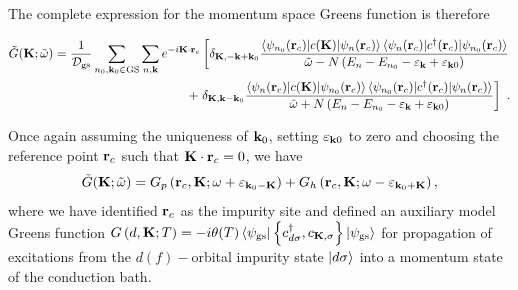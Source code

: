 \documentclass[reprint,hidelinks]{revtex4-2}
\begin{document}
The complete expression for the momentum space Greens function is therefore
\begin{widetext}
\begin{equation}\begin{aligned}
	\tilde G({\bf K}; \tilde\omega) = \frac{1}{\mathcal{D}_\text{gs}}\sum_{n_0,{\bf k}_0 \in \text{GS}}\sum_{n,{\bf k}} e^{-i {\bf K}\cdot{\bf r}_c}\left[\delta_{{\bf K}, - {\bf k} + {\bf k}_0}\frac{\braket{\psi_{n_0}({\bf r}_c)|c({\bf K})|\psi_{n}({\bf r}_c)}\braket{\psi_n({\bf r}_c)|c^\dagger({\bf r}_c)|\psi_{n_0}({\bf r}_c)}}{\tilde\omega - N\left( E_n - E_{n_0} - \varepsilon_{\bf k} + \varepsilon_{{\bf k}0}\right) } \right. \\
	+ \left.\delta_{{\bf K}, {\bf k} - {\bf k}_0}\frac{\braket{\psi_{n}({\bf r}_c)|c({\bf K})|\psi_{n_0}({\bf r}_c)}\braket{\psi_{n_0}({\bf r}_c)|c^\dagger({\bf r}_c)|\psi_{n}({\bf r}_c)}}{\tilde\omega + N\left( E_n - E_{n_0} - \varepsilon_{\bf k} + \varepsilon_{{\bf k}0}\right) }\right] ~.
\end{aligned}\end{equation}
\end{widetext}
Once again assuming the uniqueness of \({\bf k}_0\), setting \(\varepsilon_{{\bf k}0}\) to zero and choosing the reference point \({\bf r}_c\) such that \({\bf K}\cdot{\bf r}_c = 0\), we have
\begin{equation}\begin{aligned}
	\tilde G({\bf K}; \tilde\omega) = G_p\left({\bf r}_c, {\bf K}; \omega + \varepsilon_{{\bf k}_0 - {\bf K}}\right) + G_h\left({\bf r}_c, {\bf K}; \omega - \varepsilon_{{\bf k}_0 + {\bf K}}\right),
\end{aligned}\end{equation}
where we have identified \({\bf r}_c\) as the impurity site and defined an auxiliary model Greens function \(G\left(d, {\bf K}; T\right) = -i\theta(T)\braket{\psi_\text{gs} | \left\{c^\dagger_{d\sigma}, c_{{\bf K},\sigma}\right\} | \psi_\text{gs}} \) for propagation of excitations from the \(d(f)-\)orbital impurity state \(\ket{d\sigma}\) into a momentum state of the conduction bath.
\end{document}
